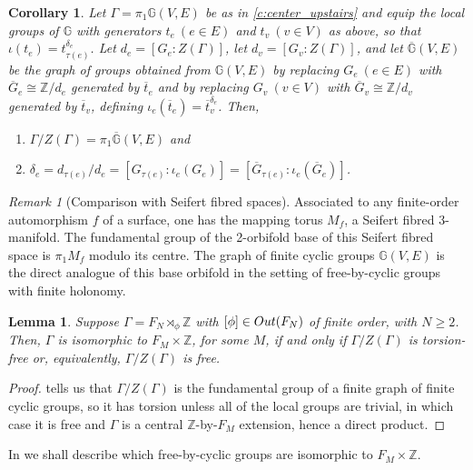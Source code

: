 \documentclass[11pt, a4 paper]{amsart}
\numberwithin{equation}{section}
\newtheorem{lemma}[theorem]{Lemma}
\newtheorem{corollary}[theorem]{Corollary}
\theoremstyle{remark}
\newtheorem{remark}[theorem]{Remark}
\theoremstyle{definition}
\def\Z{\mathbb Z}
\def\G{\Gamma}
\def\-{\overline}
\def\outN{{\rm{Out}}(F_N)}
\def\GG{\mathbb{G}}
\def\d{\delta}
\def\t{\tau}
\def\-{\overline}
\def\G{\Gamma}
\begin{document}
\begin{corollary}
\label{corollary:GmodZ}
	Let $\G=\pi_1\GG(V,E)$ be as in \cref{c:center_upstairs} 
	and equip the local groups of $\GG$ 
	with generators $t_e \ (e\in E)$ and $t_v\ (v\in V)$ as above, 
	so that $\iota(t_e)= t_{\t(e)}^{\d_e}$. 
	Let $d_e = [G_e \colon Z(\G)]$, let $d_v = [G_v\colon Z(\G)]$, 
	and let $\-{\GG}(V,E)$ be the graph of groups 
	obtained from $\GG(V,E)$ by replacing 
	$G_e\ (e\in E)$ with $\-{G}_e\cong \Z/d_e$ generated by $\-t_e$ 
	and by replacing $G_v\ (v\in V)$ with $\-{G}_v\cong \Z/d_v$
	generated by $\-t_v$, defining $\iota_e(\-t_e) = \-t_v^{\d_e}$. 
	Then, 
	\begin{enumerate}
		\item $\G/Z(\G) = \pi_1\-{\GG}(V,E)$ and
		\item $\d_e = d_{\t(e)} / d_e = [G_{\t(e)}: \iota_e(G_e)] = [\-G_{\t(e)}: \iota_e(\-G_e)]$.
	\end{enumerate} 
\end{corollary}

\begin{remark}%
[Comparison with Seifert fibred spaces]
	Associated to any finite-order automorphism $f$ of a surface, 
	one has the mapping torus $M_f$, a Seifert fibred 3-manifold.
	The fundamental group of the 2-orbifold base 
	of this Seifert fibred space is $\pi_1M_f$ modulo its centre. 
	The graph of finite cyclic groups $\GG(V,E)$ 
	is the direct analogue of this base orbifold 
	in the setting of free-by-cyclic groups with finite holonomy. 
\end{remark}

\begin{lemma}
\label{l:seeFxZ} 
	Suppose $\G=F_N\rtimes_\phi\Z$ with $[\phi]\in\outN$ of finite order, with $N\ge 2$.
	Then, $\G$ is isomorphic to $F_M\times\Z$, for some $M$, 
	if and only if $\G/Z(\G)$ is torsion-free
	or, equivalently, $\Gamma/Z(\Gamma)$ is free.
\end{lemma}

\begin{proof}
	 tells us 
	that $\G/Z(\G)$ is the fundamental group
	of a finite graph of finite cyclic groups, 
	so it has torsion unless all of the local groups are trivial, 
	in which case it is free 
	and $\G$ is a central $\Z$-by-$F_M$ extension, 
	hence a direct product.
\end{proof}

In  we shall describe 
which free-by-cyclic groups are isomorphic to $F_M\times\Z$. 
\end{document}
